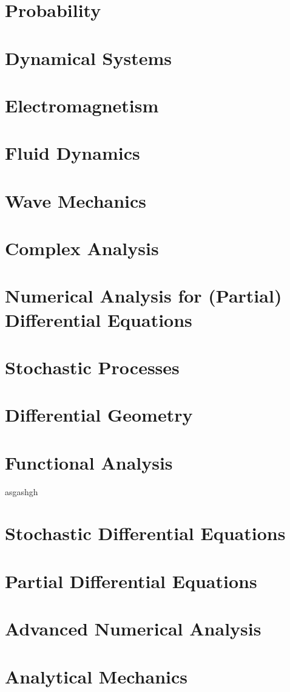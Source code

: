 \documentclass[10pt]{article}
\begin{document}
\section{Probability}
\section{Dynamical Systems}
\section{Electromagnetism}
\section{Fluid Dynamics}
\section{Wave Mechanics}
\section{Complex Analysis}
\section{Numerical Analysis for (Partial) Differential Equations}
\section{Stochastic Processes}
\section{Differential Geometry}
\section{Functional Analysis}
asgashgh
\section{Stochastic Differential Equations}
\section{Partial Differential Equations}
\section{Advanced Numerical Analysis}
\section{Analytical Mechanics}
\end{document}

